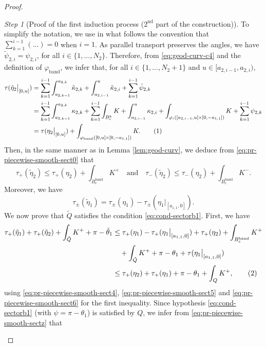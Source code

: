 \documentclass{article}
\newcommand{\PLH}{{\mkern-1mu\times\mkern-1mu}}
\newcommand{\Times}{\PLH}
\newcommand{\ko}{\kappa}
\newcommand{\sect}{Q}
\newcommand{\halfP}{B}
\newcommand{\phiband}{\varphi_{\mathrm{band}}}
\newcommand{\Bcband}{B_c^{\mathrm{band}}}
\theoremstyle{remark}
\theoremstyle{prpart}
\newtheorem{proofpart}{Step}
\newcommand{\snum}{\addtocounter{equation}{1}\tag{\theequation}}
\begin{document}
\begin{proof}
\begin{proofpart}[Proof of the first induction process ($2^{\text{nd}}$ part of the construction)]
To simplify the notation, we use in what follows the convention that $\sum_{k=1}^{i-1}(...)=0$ when $i=1$. As parallel transport preserves the angles, we have $\tilde\psi_{2,i} = \psi_{2,i}$, for all $i\in\{1,...,N_2\}$. Therefore, from \eqref{eq:geod-curv-c4} and the definition of $\phiband$, we infer that, for all $ i\in\{1,...,N_2+1\}$ and $u\in[a_{2,i-1},a_{2,i})$,
\begin{align*}
  \tau(\tilde\eta_2\big|_{[0,u]}) &= \sum_{k=1}^{i-1}\int_{a_{2,k-1}}^{a_{2,k}}\tilde\ko_{2,k} + \int_{a_{2,i-1}}^u\tilde\ko_{2,i} + \sum_{k=1}^{i-1}\tilde\psi_{2,k}\\
  &= \sum_{k=1}^{i-1}\int_{a_{2,k-1}}^{a_{2,k}}\ko_{2,k} + \sum_{k=1}^{i-1}\int_{\halfP^k_c}K  
  + \int_{a_{2,i-1}}^u\ko_{2,i} + \int_{\varphi_i([a_{2,i-1},u]\Times[0,-a_{1,1}])}K + \sum_{k=1}^{i-1}\psi_{2,k}\\
  & =  \tau(\eta_2\big|_{[0,u]}) + \int_{\phiband([0,u]\Times[0,-a_{1,1}])} K.\snum\label{eq:pr-piecewise-smooth-sect0}
\end{align*}
Then, in the same manner as in Lemma \ref{lem:geod-curv}, we deduce from \eqref{eq:pr-piecewise-smooth-sect0} that
\begin{equation}\label{eq:pr-piecewise-smooth-sect5}
  \tau_+(\tilde\eta_2) \leq \tau_+(\eta_2)  + \int_{\Bcband} K^+ \quad\text{and}\quad\tau_-(\tilde\eta_2) \leq \tau_-(\eta_2)  + \int_{\Bcband} K^-.
\end{equation}
Moreover, we have 
\begin{equation}\label{eq:pr-piecewise-smooth-sect6}
  \tau_\pm(\tilde\eta_1) = \tau_\pm(\eta_1)-\tau_\pm(\eta_1\big|_{[a_{1,1},0]}).
\end{equation}
We now prove that $\tilde \sect$ satisfies the condition \eqref{eq:cond-sectorb1}. First, we have 
\begin{align*}
  \tau_+(\tilde\eta_1) + \tau_+(\tilde\eta_2) + \int_{\tilde \sect}K^+ + \pi-\tilde\theta_1 &\leq  \tau_+(\eta_1)-\tau_+(\eta_1\big|_{[a_{1,1},0]}) + \tau_+(\eta_2) + \int_{\Bcband}K^+\\
  &\quad+ \int_{\tilde \sect} K^+ + \pi-\theta_1 + \tau(\eta_1\big|_{[a_{1,1},0]}) \\
  &\leq \tau_+(\eta_2) + \tau_+(\eta_1) + \pi-\theta_1 + \int_\sect K^+, \snum\label{eq:pr-piecewise-smooth-sectz}
\end{align*}
using \eqref{eq:pr-piecewise-smooth-sect4}, \eqref{eq:pr-piecewise-smooth-sect5} and \eqref{eq:pr-piecewise-smooth-sect6} for the first inequality. Since hypothesis \eqref{eq:cond-sectorb1} (with $\psi=\pi-\theta_1$) is satisfied by $\sect$, we infer from \eqref{eq:pr-piecewise-smooth-sectz} that 

\end{proofpart}
\end{proof}
\end{document}
